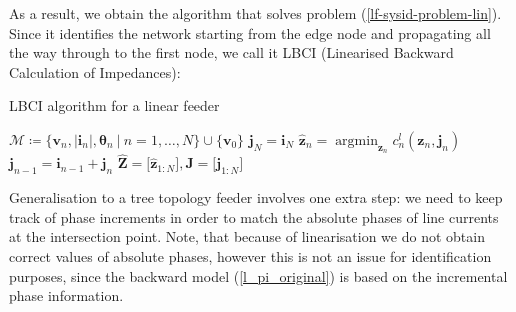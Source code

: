 \documentclass[journal,10pt,onecolumn,draftclsnofoot,]{IEEEtran}
\theoremstyle{plain}
\theoremstyle{definition}
\theoremstyle{remark}
\DeclareMathOperator{\argmin}{argmin}
\begin{document}
As a result, we obtain the algorithm that solves problem (\ref{lf-sysid-problem-lin}). Since it identifies the network starting from the edge node and propagating all the way through to the first node, we call it LBCI (Linearised Backward Calculation of Impedances):
\begin{algorithm}[H]
\caption{LBCI algorithm for a linear feeder}
\label{a2}
\begin{algorithmic}[1]
\State $\mathcal{M} \coloneqq \{\bm{v}_{n}, |\bm{i}_{n}|, \bm{\theta}_{n} ~\big|~ n=1, \ldots, N \} \cup \{ \bm{v}_0 \}$
\State $\bm{j}_{N} = \bm{i}_{N}$
\State $\widehat{\bm{z}}_n = \argmin_{\bm{z}_{n}} c^{l}_n(\bm{z}_{n}, \bm{j}_n)$
\State $\bm{j}_{n-1} = \bm{i}_{n-1} + \bm{j}_{n}$
\EndFor
\State \Return $\widehat{\bm{Z}} = \big[ \widehat{\bm{z}}_{1:N} \big], \bm{J} = \big[ \bm{j}_{1:N} \big]$
\EndFunction
\end{algorithmic}
\end{algorithm} 

Generalisation to a tree topology feeder involves one extra step: we need to keep track of phase increments in order to match the absolute phases of line currents at the intersection point. Note, that because of linearisation we do not obtain correct values of absolute phases, however this is not an issue for identification purposes, since the backward model (\ref{l_pi_original}) is based on the incremental phase information. 
\end{document}

